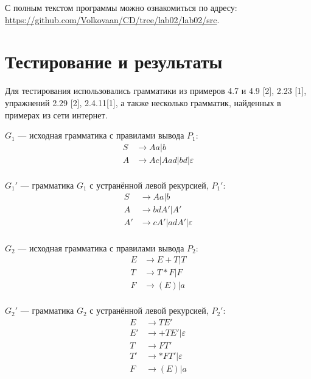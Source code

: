 \documentclass{bmstu-gost-7-32}
\begin{document}
С полным текстом программы можно ознакомиться по адресу: \url{https://github.com/Volkovaan/CD/tree/lab02/lab02/src}.

\section*{Тестирование и результаты}

Для тестирования использовались грамматики из примеров 4.7 и 4.9 [2], 2.23 [1], упражнений 2.29 [2], 2.4.11[1], а также несколько грамматик, найденных в примерах из сети интернет.

$G_1$ — исходная грамматика с правилами вывода $P_1$:
\begin{equation}
	\begin{aligned}
		S &\to Aa | b \\
		A &\to Ac | Aad | bd | \varepsilon \\
	\end{aligned}
\end{equation}

$G_1'$ — грамматика $G_1$ с устранённой левой рекурсией, $P_1'$:
\begin{equation}
	\begin{aligned}
		S &\to Aa | b \\
		A &\to bdA' | A' \\
		A' &\to cA' | adA' | \varepsilon \\
	\end{aligned}
\end{equation}

$G_2$ — исходная грамматика с правилами вывода $P_2$:
\begin{equation}
	\begin{aligned}
		E &\to E + T | T \\
		T &\to T * F | F \\
		F &\to (E) | a \\
	\end{aligned}
\end{equation}

$G_2'$ — грамматика $G_2$ с устранённой левой рекурсией, $P_2'$:
\begin{equation}
	\begin{aligned}
		E &\to TE' \\
		E' &\to +TE' | \varepsilon \\
		T &\to FT' \\
		T' &\to *FT' | \varepsilon \\
		F &\to (E) | a \\
	\end{aligned}
\end{equation}
\end{document}

